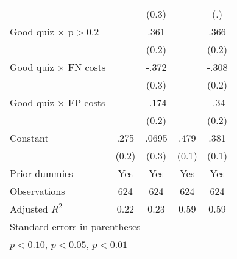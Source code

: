 \begin{table}[htbp]
\begin{tabular}{l*{4}{c}}
                &                  &    (0.3)         &                  &      (.)         \\
Good quiz $\times$ p$>$0.2&                  &     .361         &                  &     .366         \\
                &                  &    (0.2)         &                  &    (0.2)         \\
Good quiz $\times$ FN costs&                  &    -.372         &                  &    -.308         \\
                &                  &    (0.3)         &                  &    (0.2)         \\
Good quiz $\times$ FP costs&                  &    -.174         &                  &     -.34         \\
                &                  &    (0.2)         &                  &    (0.2)         \\
Constant        &     .275         &    .0695         &     .479\sym{***}&     .381\sym{***}\\
                &    (0.2)         &    (0.3)         &    (0.1)         &    (0.1)         \\
Prior dummies   &      Yes         &      Yes         &      Yes         &      Yes         \\
\hline
Observations    &      624         &      624         &      624         &      624         \\
Adjusted \(R^{2}\)&     0.22         &     0.23         &     0.59         &     0.59         \\
\hline\hline
\multicolumn{5}{l}{\footnotesize Standard errors in parentheses}\\
\multicolumn{5}{l}{\footnotesize \sym{*} \(p<0.10\), \sym{**} \(p<0.05\), \sym{***} \(p<0.01\)}\\
\end{tabular}
\end{table}
